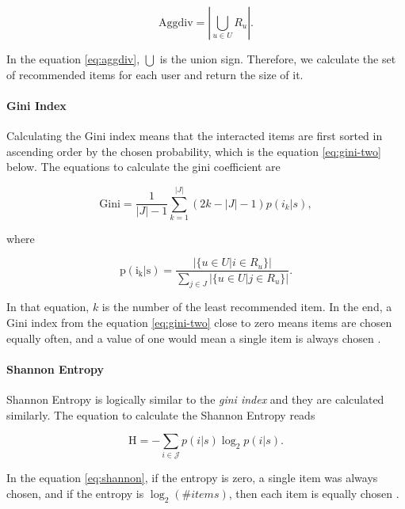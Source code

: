\begin{equation}
\mathrm {Aggdiv} = \left| \bigcup _ { u \in{ U } } R _ { u } \right| .
\label{eq:aggdiv}
\end{equation}

In the equation \eqref{eq:aggdiv}, $\bigcup$ is the union sign. Therefore, we calculate the set of recommended items for each user and return the size of it.

\paragraph{Gini Index}

Calculating the Gini index means that the interacted items are first sorted in ascending order by the chosen probability, which is the equation \eqref{eq:gini-two} below. The equations to calculate the gini coefficient are

\begin{equation}
\mathrm {Gini} = \frac { 1 } { |{ J } | - 1 } \sum _ { k = 1 } ^ { | J | } ( 2 k - | J |  - 1 ) p \left( i _ { k } | s \right) ,
\label{eq:gini}
\end{equation}

where

\begin{equation}
\mathrm {p ( i_{k} | s )} = \frac { | \{ u \in { U } | i \in R _ { u } \} | } { \sum _ { j \in J } | \{ u \in { U } | j \in R _ { u } \} | } .
\label{eq:gini-two}
\end{equation}

In that equation, $k$ is the number of the least recommended item. In the end, a Gini index from the equation \eqref{eq:gini-two} close to zero means items are chosen equally often, and a value of one would mean a single item is always chosen \cite{castells2015novelty}.

\paragraph{Shannon Entropy}

Shannon Entropy is logically similar to the \textit{gini index} and they are calculated similarly. The equation to calculate the Shannon Entropy reads

\begin{equation}
\mathrm { H } = - \sum _ { i \in \mathcal { J } } p ( i | s ) \log _ { 2 } p ( i | s ) .
\label{eq:shannon}
\end{equation}

In the equation \eqref{eq:shannon}, if the entropy is zero, a single item was always chosen, and if the entropy is $\log_{2}(\#items)$, then each item is equally chosen \cite{castells2015novelty}.

